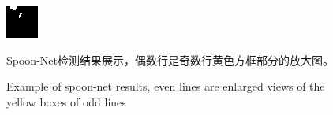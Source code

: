 \documentclass[10pt]{ctexart}
\begin{document}
\begin{figure}[H]
{{\begin{minipage}[b]{0.15\linewidth}
            \includegraphics[width=1\linewidth]{../log/spoon2/cut/tmp_cut_LC80980712014024LGN00_15443_unet.jpg}\vspace{4pt}
        \end{minipage}
    }
    }
\caption{Spoon-Net检测结果展示，偶数行是奇数行黄色方框部分的放大图。}
\addtocounter{figure}{-1}
\vspace{-5pt}
\renewcommand{\figurename}{Fig}
\caption{Example of spoon-net results, even lines are enlarged views of the yellow boxes of odd lines}
\renewcommand{\figurename}{图}
\label{Fig.main1}
\end{figure}
\end{document}
